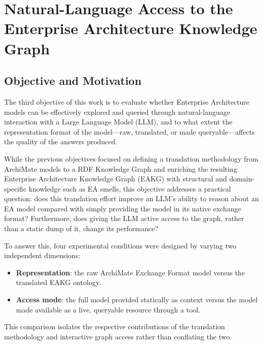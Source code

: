 
\chapter{Natural-Language Access to the Enterprise Architecture Knowledge Graph}
\label{chap:ai-evaluation}

\section{Objective and Motivation}
\label{sec:ai-objective}

The third objective of this work is to evaluate whether Enterprise Architecture models can be effectively explored and queried through natural-language interaction with a Large Language Model (LLM), and to what extent the representation format of the model---raw, translated, or made queryable---affects the quality of the answers produced.

While the previous objectives focused on defining a translation methodology from ArchiMate models to a RDF Knowledge Graph and enriching the resulting Enterprise Architecture Knowledge Graph (EAKG) with structural and domain-specific knowledge such as EA smells, this objective addresses a practical question: does this translation effort improve an LLM's ability to reason about an EA model compared with simply providing the model in its native exchange format? Furthermore, does giving the LLM active access to the graph, rather than a static dump of it, change its performance?

To answer this, four experimental conditions were designed by varying two independent dimensions:
\begin{itemize}
    \item \textbf{Representation}: the raw ArchiMate Exchange Format model versus the translated EAKG ontology.
    \item \textbf{Access mode}: the full model provided statically as context versus the model made available as a live, queryable resource through a tool.
\end{itemize}

This comparison isolates the respective contributions of the translation methodology and interactive graph access rather than conflating the two.

